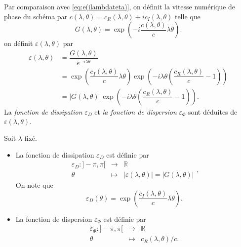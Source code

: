 Par comparaison avec \eqref{eq:e(ilambdateta)}, on définit la  vitesse numérique de phase du schéma par $c(\lambda,\theta) = c_R(\lambda,\theta) + i c_I(\lambda,\theta)$ telle que
\begin{equation}
G(\lambda, \theta) = \exp \left( - i \dfrac{c(\lambda,\theta)}{c} \lambda \theta \right).
\end{equation}
on définit $\varepsilon(\lambda, \theta)$ par
\begin{align*}
\varepsilon(\lambda,\theta) & = \dfrac{G(\lambda,\theta)}{e^{- i \lambda \theta}} \\
	& = \exp \left( \dfrac{c_I(\lambda, \theta)}{c} \lambda \theta \right) \exp \left( - i \lambda \theta \left( \dfrac{c_R(\lambda, \theta)}{c} -1 \right) \right) \\
	& = |G(\lambda, \theta)| \exp \left( - i \lambda \theta \left( \dfrac{c_R(\lambda, \theta)}{c} -1 \right) \right).
\end{align*}
La \textit{fonction de dissipation} $\varepsilon_D$ et \textit{la fonction de dispersion} $\varepsilon_{\Phi}$ sont déduites de $\varepsilon(\lambda, \theta)$.

\begin{definition}
Soit $\lambda$ fixé.
\begin{itemize}
\item La fonction de dissipation $\varepsilon_D$ est définie par
\begin{equation}
\begin{array}{rcl}
\varepsilon_D : ]- \pi, \pi[ & \rightarrow & \mathbb{R} \\
\theta & \mapsto & |\varepsilon(\lambda,\theta)| = |G(\lambda, \theta)|
\end{array},
\end{equation}
On note que 
\begin{equation}
\varepsilon_D(\theta) = \exp \left( \dfrac{c_I(\lambda, \theta)}{c} \lambda \theta \right).
\end{equation}

\item La fonction de dispersion $\varepsilon_{\Phi}$ est définie par
\begin{equation}
\begin{array}{rcl}
\varepsilon_{\Phi} : ]- \pi, \pi[ & \rightarrow & \mathbb{R} \\
\theta & \mapsto & c_R(\lambda, \theta)/c.
\end{array}
\end{equation}
\end{itemize}
\end{definition}


